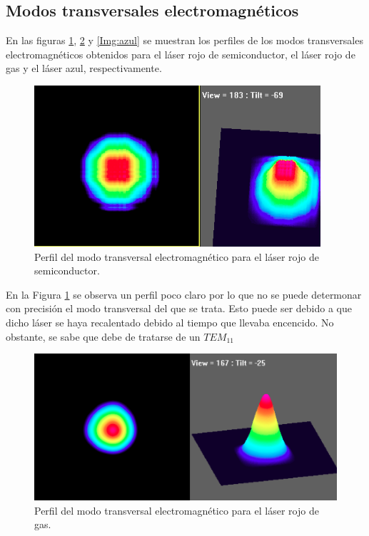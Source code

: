 \documentclass[twoside]{article}
\begin{document}
\begin{multicols}{2}
			\subsection{Modos transversales electromagnéticos}

				En las figuras \ref{Img:rojSem}, \ref{Img:rojgs} y  \ref{Img:azul} se muestran los perfiles de los modos transversales electromagnéticos obtenidos para el láser rojo de semiconductor, el láser rojo de gas y el láser azul, respectivamente.

					\begin{figure}[H]
						\centering
						\includegraphics[scale=0.38]{rojosem.png}
						\caption{\label{Img:rojSem}Perfil del modo transversal electromagnético para el láser rojo de semiconductor.}
					\end{figure}

				En la Figura \ref{Img:rojSem} se observa un perfil poco claro por lo que no se puede determonar con precisión el modo transversal del que se trata. Esto puede ser debido a que dicho láser se haya recalentado debido al tiempo que llevaba encencido. No obstante, se sabe que debe de tratarse de un $TEM_{11}$

					\begin{figure}[H]
						\centering
						\includegraphics[scale=0.38]{rojogas.png}
						\caption{\label{Img:rojgs}Perfil del modo transversal electromagnético para el láser rojo de gas.}
					\end{figure}


\end{multicols}
\end{document}
